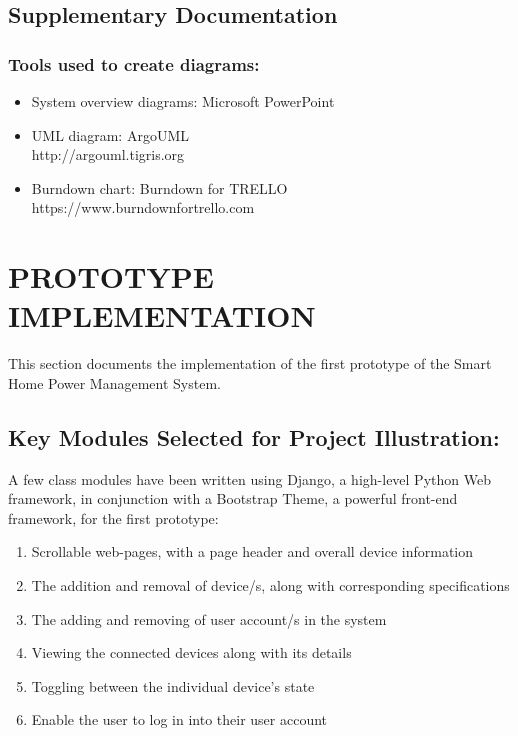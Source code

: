 \documentclass[10pt,twocolumn]{witseiepaper}
\begin{document}
	
	\subsection{Supplementary Documentation}
	\subsubsection{Tools used to create diagrams:}
	\begin{itemize}
		\item System overview diagrams: Microsoft PowerPoint
		\item UML diagram: ArgoUML\\http://argouml.tigris.org
		\item Burndown chart: Burndown for TRELLO\\https://www.burndownfortrello.com
	\end{itemize}
	
	\section{PROTOTYPE IMPLEMENTATION}
	
	This section documents the implementation of the first prototype of the Smart Home Power Management System. 	
	
	\subsection{Key Modules Selected for Project Illustration:}
	A few class modules have been written using Django, a high-level Python Web framework, in conjunction with a Bootstrap Theme, a powerful front-end framework, for the first prototype: 
	\begin{enumerate}
		\item Scrollable web-pages, with a page header and overall device information
		\item The addition and removal of device/s, along with corresponding specifications
		\item The adding and removing of user account/s in the system
		\item Viewing the connected devices along with its details
		\item Toggling between the individual device's state
		\item Enable the user to log in into their user account
	\end{enumerate}
	
\end{document}
